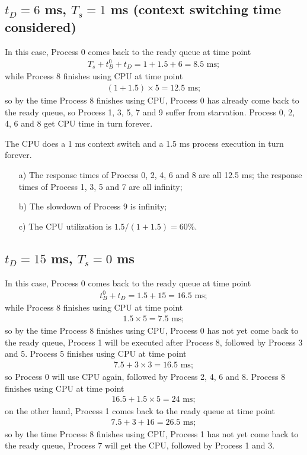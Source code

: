 \documentclass[12pt,letterpaper]{article}
\begin{document}
\subsection{$t_D=6$ ms, $T_s = 1$ ms (context switching time considered)} 
In this case, Process 0 comes back to the ready queue at time point
\begin{eqnarray}
T_s+t_B^0+t_D=1+1.5+6=8.5\textrm{ ms};
\end{eqnarray}
while Process 8 finishes using CPU at time point 
\begin{eqnarray}
(1+1.5)\times5=12.5\textrm{ ms};
\end{eqnarray}
so by the time Process 8 finishes using CPU, Process 0 has already come back to the ready queue, so Process 1, 3, 5, 7 and 9 suffer from starvation. Process 0, 2, 4, 6 and 8 get CPU time in turn forever.

The CPU does a 1 ms context switch and a 1.5 ms process execution in turn forever.

\begin{enumerate}
\item[a)] The response times of Process 0, 2, 4, 6 and 8 are all 12.5 ms; the response times of Process 1, 3, 5 and 7 are all infinity;
\item[b)] The slowdown of Process 9 is infinity;
\item[c)] The CPU utilization is $1.5/(1+1.5)=60\%$.
\end{enumerate}

\subsection{$t_D=15$ ms, $T_s = 0$ ms}
In this case, Process 0 comes back to the ready queue at time point
\begin{eqnarray}
t_B^0+t_D=1.5+15=16.5\textrm{ ms};
\end{eqnarray}
while Process 8 finishes using CPU at time point 
\begin{eqnarray}
1.5\times5=7.5\textrm{ ms};
\end{eqnarray}
so by the time Process 8 finishes using CPU, Process 0 has not yet come back to the ready queue, Process 1 will be executed after Process 8, followed by Process 3 and 5. Process 5 finishes using CPU at time point
\begin{eqnarray}
7.5+3\times3=16.5\textrm{ ms};
\end{eqnarray}
so Process 0 will use CPU again, followed by Process 2, 4, 6 and 8. Process 8 finishes using CPU at time point
\begin{eqnarray}
16.5+1.5\times5=24\textrm{ ms};
\end{eqnarray}
on the other hand, Process 1 comes back to the ready queue at time point
\begin{eqnarray}
7.5+3+16=26.5\textrm{ ms};
\end{eqnarray}
so by the time Process 8 finishes using CPU, Process 1 has not yet come back to the ready queue, Process 7 will get the CPU, followed by Process 1 and 3.
\end{document}
